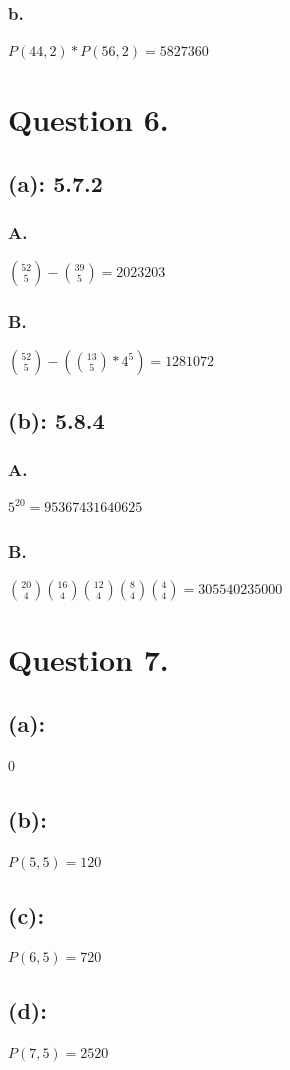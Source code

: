 \documentclass[titlepage]{article}\pagestyle{empty}
\begin{document}
\subsubsection*{b.} $P(44, 2) * P(56, 2)=5827360$

\pagebreak
\section*{Question 6.}
\subsection*{(a): 5.7.2}
\subsubsection*{A.} $\binom{52}{5}-\binom{39}{5}=2023203$
\subsubsection*{B.} $\binom{52}{5}-(\binom{13}{5}*4^5)=1281072$
\subsection*{(b): 5.8.4}
\subsubsection*{A.} $5^{20}=95367431640625$
\subsubsection*{B.} $\binom{20}{4}\binom{16}{4}\binom{12}{4}\binom{8}{4}\binom{4}{4}=305540235000$

\pagebreak
\section*{Question 7.}
\subsection*{(a):} $0$
\subsection*{(b):} $P(5, 5)=120$
\subsection*{(c):} $P(6, 5)=720$
\subsection*{(d):} $P(7, 5)=2520$
\end{document}
